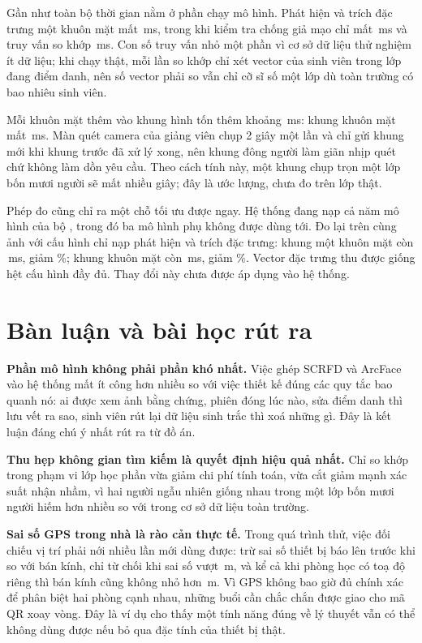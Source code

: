 Gần như toàn bộ thời gian nằm ở phần chạy mô hình. Phát hiện và trích đặc
trưng một khuôn mặt mất \HnMotMat{}\,ms, trong khi kiểm tra chống giả mạo chỉ
mất \HnChongGiaMao{}\,ms và truy vấn so khớp \HnTruyVan{}\,ms. Con số truy vấn
nhỏ một phần vì cơ sở dữ liệu thử nghiệm ít dữ liệu; khi chạy thật, mỗi lần
so khớp chỉ xét vector của sinh viên trong lớp đang điểm danh, nên số vector
phải so vẫn chỉ cỡ sĩ số một lớp dù toàn trường có bao nhiêu sinh viên.

Mỗi khuôn mặt thêm vào khung hình tốn thêm khoảng \HnMoiMatThem{}\,ms: khung
\HnSoMat{} khuôn mặt mất \HnNhieuMat{}\,ms. Màn quét camera của giảng viên chụp
2 giây một lần và chỉ gửi khung mới khi khung trước đã xử lý xong, nên khung
đông người làm giãn nhịp quét chứ không làm dồn yêu cầu. Theo cách tính này,
một khung chụp trọn một lớp bốn mươi người sẽ mất nhiều giây; đây là ước
lượng, chưa đo trên lớp thật.

Phép đo cũng chỉ ra một chỗ tối ưu được ngay. Hệ thống đang nạp cả năm mô hình
của bộ , trong đó ba mô hình phụ không được dùng tới. Đo lại
trên cùng ảnh với cấu hình chỉ nạp phát hiện và trích đặc trưng: khung một
khuôn mặt còn \HnGonMotMat{}\,ms, giảm \HnGiamMotMat\%; khung \HnSoMat{} khuôn
mặt còn \HnGonNhieuMat{}\,ms, giảm \HnGiamNhieuMat\%. Vector đặc trưng thu được
giống hệt cấu hình đầy đủ. Thay đổi này chưa được áp dụng vào hệ thống.

\section{Bàn luận và bài học rút ra}

\textbf{Phần mô hình không phải phần khó nhất.} Việc ghép SCRFD và ArcFace
vào hệ thống mất ít công hơn nhiều so với việc thiết kế đúng các quy tắc bao
quanh nó: ai được xem ảnh bằng chứng, phiên đóng lúc nào, sửa điểm danh thì
lưu vết ra sao, sinh viên rút lại dữ liệu sinh trắc thì xoá những gì. Đây là
kết luận đáng chú ý nhất rút ra từ đồ án.

\textbf{Thu hẹp không gian tìm kiếm là quyết định hiệu quả nhất.} Chỉ so khớp
trong phạm vi lớp học phần vừa giảm chi phí tính toán, vừa cắt giảm mạnh xác
suất nhận nhầm, vì hai người ngẫu nhiên giống nhau trong một lớp bốn mươi
người hiếm hơn nhiều so với trong cơ sở dữ liệu toàn trường.

\textbf{Sai số GPS trong nhà là rào cản thực tế.} Trong quá trình thử, việc
đối chiếu vị trí phải nới nhiều lần mới dùng được: trừ sai số thiết bị báo lên
trước khi so với bán kính, chỉ từ chối khi sai số vượt \FsaiSoGps{}\,m, và
kể cả khi phòng học có toạ độ riêng thì bán kính cũng không nhỏ hơn
\FbanKinhPhong\,m. Vì GPS không bao giờ đủ chính xác để phân biệt hai phòng
cạnh nhau, những buổi cần chắc chắn được giao cho mã QR xoay vòng. Đây là ví dụ cho thấy một tính
năng đúng về lý thuyết vẫn có thể không dùng được nếu bỏ qua đặc tính của
thiết bị thật.

